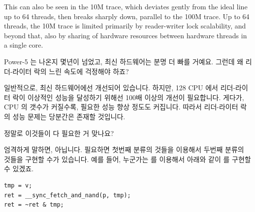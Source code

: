 \begin{enumerate}
	This can also be seen in the 10M trace, which deviates gently from
	the ideal line up to 64 threads, then breaks sharply down, parallel
	to the 100M trace.
	Up to 64 threads, the 10M trace is limited primarily by reader-writer
	lock scalability, and beyond that, also by sharing of hardware
	resources between hardware threads in a single core.
	\fi

\QuickQ{}
	Power-5 는 나온지 몇년이 넘었고, 최신 하드웨어는 분명 더 빠를 거예요.
	그런데 왜 리더-라이터 락의 느린 속도에 걱정해야 하죠?

\QuickA{}
	일반적으로, 최신 하드웨어에선 개선되어 있습니다.
	하지만, 128 CPU 에서 리더-라이터 락이 이상적인 성능을 달성하기 위해선
	100배 이상의 개선이 필요합니다.
	게다가, CPU 의 갯수가 커질수록, 필요한 성능 향상 정도도 커집니다.
	따라서 리더-라이터 락의 성능 문제는 당분간은 존재할 것입니다.

\QuickQ{}
	정말로 이것들이 다 필요한 거 맞나요?

\QuickA{}
	엄격하게 말하면, 아닙니다.
	필요하면 첫번째 분류의 것들을 이용해서 두번째 분류의 것들을 구현할 수가
	있습니다.
	예를 들어, 누군가는  를 이용해서
	아래와 같이  를 구현할 수 있겠죠.

\vspace{5pt}
\begin{minipage}[t]{\columnwidth}
\scriptsize
\begin{verbatim}
tmp = v;
ret = __sync_fetch_and_nand(p, tmp);
ret = ~ret & tmp;
\end{verbatim}
\end{minipage}
\vspace{5pt}


\end{enumerate}
